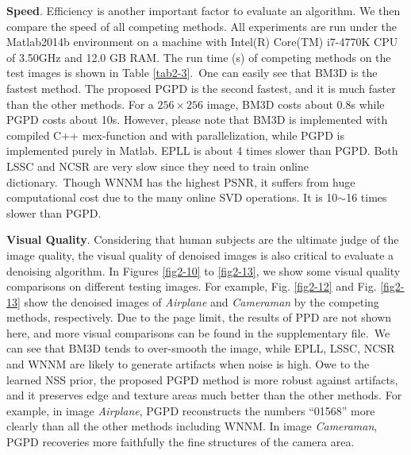 \textbf{Speed}. Efficiency is another important factor to evaluate an algorithm. We then compare the speed of all competing methods. All experiments are run under the Matlab2014b environment on a machine with Intel(R) Core(TM) i7-4770K CPU of 3.50GHz and 12.0 GB RAM. The run time (s) of competing methods on the test images is shown in Table \ref{tab2-3}.\ One can easily see that BM3D is the fastest method. The proposed PGPD is the second fastest, and it is much faster than the other methods. For a $256\times256$ image, BM3D costs about 0.8s while PGPD costs about 10s. However, please note that BM3D is implemented with compiled C++ mex-function and with parallelization, while PGPD is implemented purely in Matlab. EPLL is about 4 times slower than PGPD. Both LSSC and NCSR are very slow since they need to train online dictionary.\ Though WNNM has the highest PSNR, it suffers from huge computational cost due to the many online SVD operations. It is 10$\sim$16 times slower than PGPD. 

\textbf{Visual Quality}. Considering that human subjects are the ultimate judge of the image quality, the visual quality of denoised images is also critical to evaluate a denoising algorithm. In Figures \ref{fig2-10} to \ref{fig2-13}, we show some visual quality comparisons on different testing images. For example, Fig. \ref{fig2-12} and Fig. \ref{fig2-13} show the denoised images of \textsl{Airplane} and \textsl{Cameraman} by the competing methods, respectively. Due to the page limit, the results of PPD are not shown here, and more visual comparisons can be found in the supplementary file.\ We can see that BM3D tends to over-smooth the image, while EPLL, LSSC, NCSR and WNNM are likely to generate artifacts when noise is high. Owe to the learned NSS prior, the proposed PGPD method is more robust against artifacts, and it preserves edge and texture areas much better than the other methods. For example, in image \textsl{Airplane}, PGPD reconstructs the numbers ``01568'' more clearly than all the other methods including WNNM. In image \textsl{Cameraman}, PGPD recoveries more faithfully the fine structures of the camera area. 

